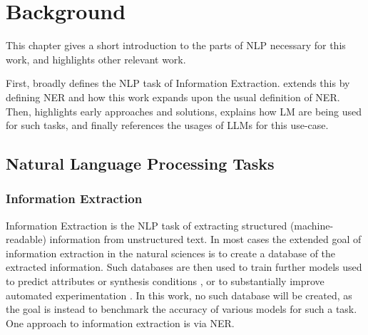 \chapter{Background}\label{chap:background}

This chapter gives a short introduction to the parts of \acrlong{NLP} necessary for this work, and highlights other relevant work.

First,  broadly defines the \gls{NLP} task of Information Extraction.
 extends this by defining \gls{NER} and how this work expands upon the usual definition of \gls{NER}.
Then,  highlights early approaches and solutions,  explains how \gls{LM} are being used for such tasks, and finally  references the usages of \glspl{LLM} for this use-case.






\section{Natural Language Processing Tasks}\label{sec:NLP}

\subsection{Information Extraction}\label{sub:extraction}
Information Extraction is the \gls{NLP} task of extracting structured (machine-readable) information from unstructured text.
In most cases the extended goal of information extraction in the natural sciences is to create a database of the extracted information.
Such databases are then used to train further models used to predict attributes or synthesis conditions \cite{luo_mof_2022}, or to substantially improve automated experimentation \cite{shi_automated_2021}.
In this work, no such database will be created, as the goal is instead to benchmark the accuracy of various models for such a task.
One approach to information extraction is via \gls{NER}.

